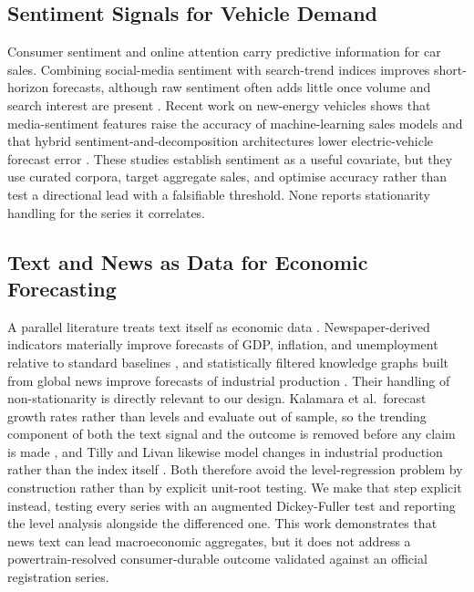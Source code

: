 \documentclass[conference]{IEEEtran}
\begin{document}
\subsection{Sentiment Signals for Vehicle Demand}
Consumer sentiment and online attention carry predictive information for car
sales. Combining social-media sentiment with search-trend indices improves
short-horizon forecasts, although raw sentiment often adds little once volume
and search interest are present \cite{wijnhoven2017}. Recent work on new-energy
vehicles shows that media-sentiment features raise the accuracy of
machine-learning sales models \cite{shao2025} and that hybrid
sentiment-and-decomposition architectures lower electric-vehicle forecast error
\cite{liu2025}. These studies establish sentiment as a useful covariate, but
they use curated corpora, target aggregate sales, and optimise accuracy rather
than test a directional lead with a falsifiable threshold. None reports
stationarity handling for the series it correlates.

\subsection{Text and News as Data for Economic Forecasting}
A parallel literature treats text itself as economic data \cite{gentzkow2019}.
Newspaper-derived indicators materially improve forecasts of GDP, inflation, and
unemployment relative to standard baselines \cite{kalamara2022}, and
statistically filtered knowledge graphs built from global news improve forecasts
of industrial production \cite{tilly2021}. Their handling of non-stationarity is
directly relevant to our design. Kalamara et al.\ forecast growth rates rather
than levels and evaluate out of sample, so the trending component of both the
text signal and the outcome is removed before any claim is made
\cite{kalamara2022}, and Tilly and Livan likewise model changes in industrial
production rather than the index itself \cite{tilly2021}. Both therefore avoid
the level-regression problem by construction rather than by explicit unit-root
testing. We make that step explicit instead, testing every series with an
augmented Dickey-Fuller test and reporting the level analysis alongside the
differenced one. This work demonstrates that news text can lead macroeconomic
aggregates, but it does not address a powertrain-resolved consumer-durable
outcome validated against an official registration series.
\end{document}
